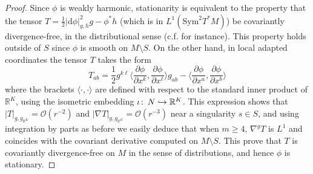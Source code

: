 \documentclass{article}
\numberwithin{equation}{section}        %
\theoremstyle{bfnote}
\theoremstyle{definition}
\theoremstyle{bfremark}
\newcommand{\col}{\colon \thinspace}        %
\newcommand{\R}{\mathbb{R}}                 %
\newcommand{\diff}{\mathrm{d}}                      %
\begin{document}
\begin{proof}
    Since $\phi$ is weakly harmonic, stationarity is equivalent to the property that the tensor $T = \tfrac{1}{2} |\diff\phi|^2_{g,h} g - \phi^*h$ (which is in $L^1(\mathrm{Sym}^2T^*M)$) be covariantly divergence-free, in the distributional sense (c.f. \cite[\S3.1]{helein2007harmonic} for instance). This property holds outside of $S$ since $\phi$ is smooth on $M \setminus S$. On the other hand, in local adapted coordinates the tensor $T$ takes the form
    \begin{equation*}
        T_{ab} = \frac{1}{2} g^{k\ell} \langle \frac{\partial \phi}{\partial x^k}, \frac{\partial \phi}{\partial x^\ell} \rangle g_{ab} - \langle \frac{\partial \phi}{\partial x^a}, \frac{\partial \phi}{\partial x^b} \rangle
    \end{equation*}
    where the brackets $\langle \cdot , \cdot \rangle$ are defined with respect to the standard inner product of $\R^K$, using the isometric embedding $\iota \col N \hookrightarrow \R^K$. This expression shows that $|T|_{g,g_{\R^K}} = \mathcal{O}(r^{-2})$ and $|\nabla T|_{g,g_{\R^K}} = \mathcal{O}(r^{-3})$ near a singularity $s \in S$, and using integration by parts as before we easily deduce that when $m \geq 4$, $\nabla^{g} T$ is $L^1$ and coincides with the covariant derivative computed on $M \setminus S$. This prove that $T$ is covariantly divergence-free on $M$ in the sense of distributions, and hence $\phi$ is stationary.
\end{proof}

\small




\end{document}
